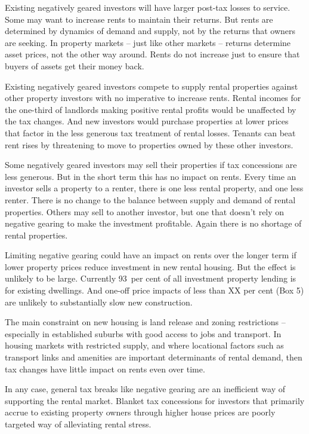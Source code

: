 \documentclass{grattan}\usepackage[]{graphicx}\usepackage[]{color}
\begin{document}
Existing negatively geared investors will have larger post-tax losses to service. Some may want to increase rents to maintain their returns. But rents are determined by dynamics of demand and supply, not by the returns that owners are seeking. In property markets -- just like other markets -- returns determine asset prices, not the other way around. Rents do not increase just to ensure that buyers of assets get their money back.

Existing negatively geared investors compete to supply rental properties against other property investors with no imperative to increase rents. Rental incomes for the one-third of landlords making positive rental profits would be unaffected by the tax changes. And new investors would purchase properties at lower prices that factor in the less generous tax treatment of rental losses. Tenants can beat rent rises by threatening to move to properties owned by these other investors. 

Some negatively geared investors may sell their properties if tax concessions are less generous. But in the short term this has no impact on rents.  Every time an investor sells a property to a renter, there is one less rental property, and one less renter. There is no change to the balance between supply and demand of rental properties. Others may sell to another investor, but one that doesn't rely on negative gearing to make the investment profitable. Again there is no shortage of rental properties. 

Limiting negative gearing could have an impact on rents over the longer term if lower property prices reduce investment in new rental housing. But the effect is unlikely to be large. Currently 93~per cent of all investment property lending is for existing dwellings.  And one-off price impacts of less than XX per cent (Box 5) are unlikely to substantially slow new construction.  

The main constraint on new housing is land release and zoning restrictions -- especially in established suburbs with good access to jobs and transport.    In housing markets with restricted supply, and where locational factors such as transport links and amenities are important determinants of rental demand, then tax changes have little impact on rents even over time. 

In any case, general tax breaks like negative gearing are an inefficient way of supporting the rental market.   Blanket tax concessions for investors that primarily accrue to existing property owners through higher house prices are poorly targeted way of alleviating rental stress.  
\end{document}
